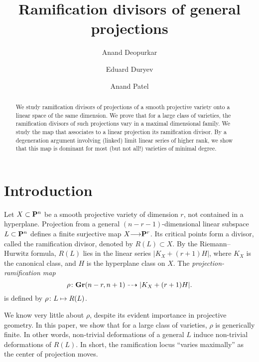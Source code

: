 \documentclass[11pt,reqno]{amsart}
\title[Projection and ramification]{Ramification divisors of general projections}
\author[Deopurkar]{Anand Deopurkar}
\author[Duryev]{Eduard Duryev}
\author[Patel]{Anand Patel}
\theoremstyle{plain}
\theoremstyle{definition}
\theoremstyle{remark}
\numberwithin{equation}{section}
\renewcommand{\to}{{\longrightarrow}}
\numberwithin{equation}{section}
\begin{document}
\begin{abstract}
  We study ramification divisors of projections of a smooth projective variety onto a linear space of the same dimension.
  We prove that for a large class of varieties, the ramification divisors of such projections vary in a maximal dimensional family.
  We study the map that associates to a linear projection its ramification divisor.
  By a degeneration argument involving (linked) limit linear series of higher rank, we show that this map is dominant for most (but not all!) varieties of minimal degree. 
\end{abstract}


\maketitle

\section{Introduction}\label{sec:intro}

Let $X \subset \P^n$ be a smooth projective variety of dimension $r$, not contained in a hyperplane.
Projection from a general $(n-r-1)$-dimensional linear subspace $L \subset \P^n$ defines a finite surjective map $X \to \P^r$.
Its critical points form a divisor, called the ramification divisor, denoted by $R(L) \subset X$.
By the Riemann--Hurwitz formula, $R(L)$ lies in the linear series $|K_X + (r+1)H|$, where $K_X$ is the canonical class, and $H$ is the hyperplane class on $X$.
The \emph{projection-ramification map}
\[
  \rho \from \Gr(n-r, n+1) \dashrightarrow |K_X + (r+1)H|.
\]
is defined by $\rho \from L \mapsto R(L)$.

We know very little about $\rho$, despite its evident importance in projective geometry.
In this paper, we show that for a large class of varieties, $\rho$ is generically finite.
In other words, non-trivial deformations of a general $L$ induce non-trivial deformations of $R(L)$.
In short, the ramification locus ``varies maximally'' as the center of projection moves.
\end{document}
